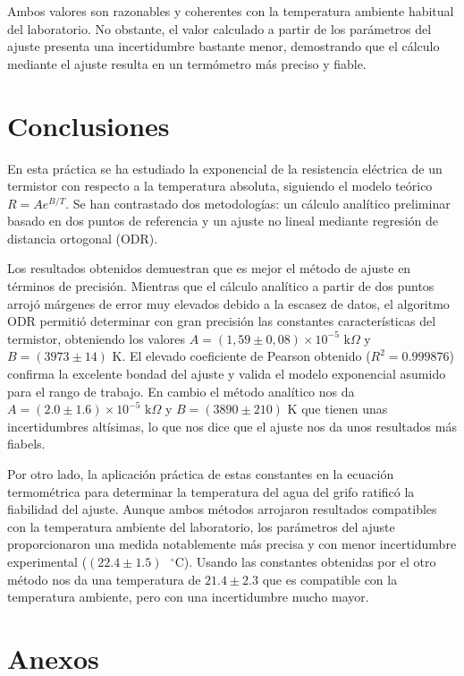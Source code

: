 \documentclass[11pt,a4paper]{article}
\begin{document}
Ambos valores son razonables y coherentes con la temperatura ambiente habitual del laboratorio. No obstante, el valor calculado a partir de los parámetros del ajuste presenta una incertidumbre bastante menor, demostrando que el cálculo mediante el ajuste resulta en un termómetro más preciso y fiable.

\section{Conclusiones}
En esta práctica se ha estudiado la exponencial de la resistencia eléctrica de un termistor con respecto a la temperatura absoluta, siguiendo el modelo teórico $R=Ae^{B/T}$. Se han contrastado dos metodologías: un cálculo analítico preliminar basado en dos puntos de referencia y un ajuste no lineal mediante regresión de distancia ortogonal (ODR).

Los resultados obtenidos demuestran que es mejor el método de ajuste en términos de precisión. Mientras que el cálculo analítico a partir de dos puntos arrojó márgenes de error muy elevados debido a la escasez de datos, el algoritmo ODR permitió determinar con gran precisión las constantes características del termistor, obteniendo los valores $A=(1,59\pm0,08)\times10^{-5}\text{ k}\Omega$ y $B=(3973\pm14)\text{ K}$. El elevado coeficiente de Pearson obtenido ($R^2=0.999876$) confirma la excelente bondad del ajuste y valida el modelo exponencial asumido para el rango de trabajo. En cambio el método analítico nos da $A=(2.0\pm1.6)\times10^{-5}\text{ k}\Omega$ y $B=(3890\pm210)\text{ K}$ que tienen unas incertidumbres altísimas, lo que nos dice que el ajuste nos da unos resultados más fiabels.

Por otro lado, la aplicación práctica de estas constantes en la ecuación termométrica para determinar la temperatura del agua del grifo ratificó la fiabilidad del ajuste. Aunque ambos métodos arrojaron resultados compatibles con la temperatura ambiente del laboratorio, los parámetros del ajuste proporcionaron una medida notablemente más precisa y con menor incertidumbre experimental ($(22.4\pm1.5)\text{ }^{\circ}\text{C}$). Usando las constantes obtenidas por el otro método nos da una temperatura de $21.4\pm2.3$ que es compatible con la temperatura ambiente, pero con una incertidumbre mucho mayor.


\appendix
\section{Anexos}
\end{document}
